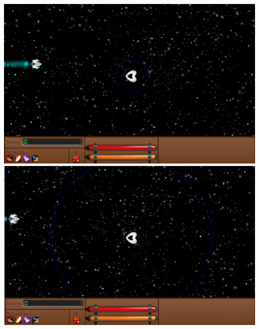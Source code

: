 \begin{itemize}
\begin{itemize}
				\end{itemize}
\includegraphics{images/vaisseaux/support_little.png}
\includegraphics{images/vaisseaux/support_huge.png}
				\par~
		\end{itemize}